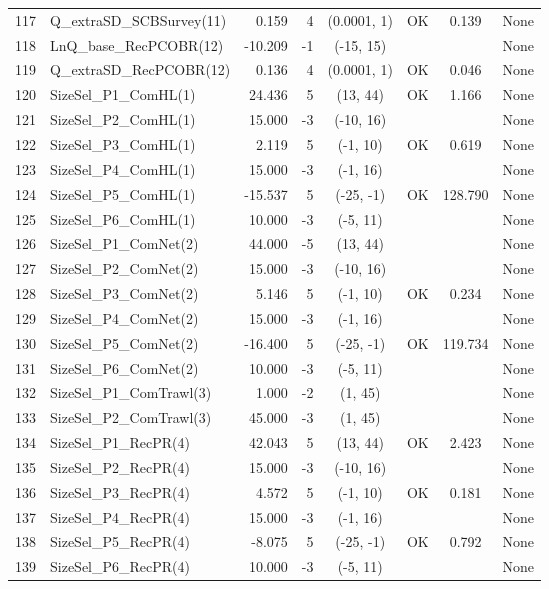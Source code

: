 \documentclass[12pt,]{article}
\begin{document}
\begin{landscape}
\begin{longtable}{rlrrcccl}
  117 & Q\_extraSD\_SCBSurvey(11) & 0.159 & 4 & (0.0001, 1) & OK & 0.139 & None \\ 
  118 & LnQ\_base\_RecPCOBR(12) & -10.209 & -1 & (-15, 15) &  &  & None \\ 
  119 & Q\_extraSD\_RecPCOBR(12) & 0.136 & 4 & (0.0001, 1) & OK & 0.046 & None \\ 
  120 & SizeSel\_P1\_ComHL(1) & 24.436 & 5 & (13, 44) & OK & 1.166 & None \\ 
  121 & SizeSel\_P2\_ComHL(1) & 15.000 & -3 & (-10, 16) &  &  & None \\ 
  122 & SizeSel\_P3\_ComHL(1) & 2.119 & 5 & (-1, 10) & OK & 0.619 & None \\ 
  123 & SizeSel\_P4\_ComHL(1) & 15.000 & -3 & (-1, 16) &  &  & None \\ 
  124 & SizeSel\_P5\_ComHL(1) & -15.537 & 5 & (-25, -1) & OK & 128.790 & None \\ 
  125 & SizeSel\_P6\_ComHL(1) & 10.000 & -3 & (-5, 11) &  &  & None \\ 
  126 & SizeSel\_P1\_ComNet(2) & 44.000 & -5 & (13, 44) &  &  & None \\ 
  127 & SizeSel\_P2\_ComNet(2) & 15.000 & -3 & (-10, 16) &  &  & None \\ 
  128 & SizeSel\_P3\_ComNet(2) & 5.146 & 5 & (-1, 10) & OK & 0.234 & None \\ 
  129 & SizeSel\_P4\_ComNet(2) & 15.000 & -3 & (-1, 16) &  &  & None \\ 
  130 & SizeSel\_P5\_ComNet(2) & -16.400 & 5 & (-25, -1) & OK & 119.734 & None \\ 
  131 & SizeSel\_P6\_ComNet(2) & 10.000 & -3 & (-5, 11) &  &  & None \\ 
  132 & SizeSel\_P1\_ComTrawl(3) & 1.000 & -2 & (1, 45) &  &  & None \\ 
  133 & SizeSel\_P2\_ComTrawl(3) & 45.000 & -3 & (1, 45) &  &  & None \\ 
  134 & SizeSel\_P1\_RecPR(4) & 42.043 & 5 & (13, 44) & OK & 2.423 & None \\ 
  135 & SizeSel\_P2\_RecPR(4) & 15.000 & -3 & (-10, 16) &  &  & None \\ 
  136 & SizeSel\_P3\_RecPR(4) & 4.572 & 5 & (-1, 10) & OK & 0.181 & None \\ 
  137 & SizeSel\_P4\_RecPR(4) & 15.000 & -3 & (-1, 16) &  &  & None \\ 
  138 & SizeSel\_P5\_RecPR(4) & -8.075 & 5 & (-25, -1) & OK & 0.792 & None \\ 
  139 & SizeSel\_P6\_RecPR(4) & 10.000 & -3 & (-5, 11) &  &  & None \\ 

\end{longtable}
\end{landscape}
\end{document}
